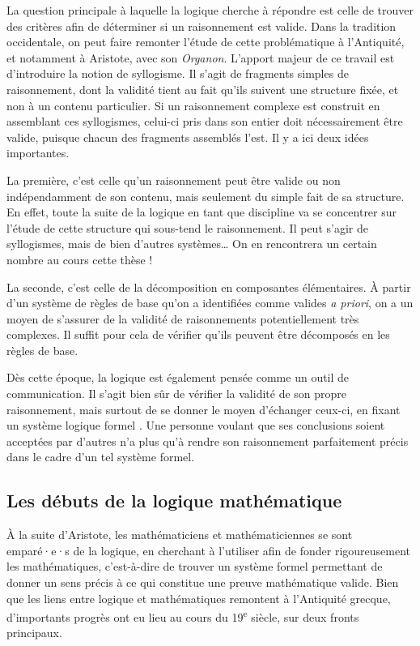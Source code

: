 La question principale à laquelle la logique cherche à répondre
est celle de trouver des critères afin de déterminer si un raisonnement est valide.
Dans la tradition occidentale, on peut faire remonter l’étude de cette problématique
à l’Antiquité, et notamment à Aristote, avec son \textit{Organon}.
L’apport majeur de ce travail est d’introduire la notion de syllogisme.
Il s’agit de fragments simples de raisonnement, dont la validité tient au fait qu’ils
suivent une structure fixée, et non à un contenu particulier.%
Si un raisonnement complexe est construit en assemblant ces syllogismes,
celui-ci pris dans son entier doit nécessairement être valide, puisque
chacun des fragments assemblés l’est. Il y a ici deux idées importantes.

La première, c’est celle qu’un raisonnement peut être
valide ou non indépendamment de son contenu, mais seulement du simple fait de sa structure.
En effet, toute la suite de la logique en tant que discipline va se concentrer sur l’étude
de cette structure qui sous-tend le raisonnement.
Il peut s’agir de syllogismes, mais de bien d’autres systèmes… On en rencontrera
un certain nombre au cours cette thèse !

La seconde, c’est celle de la décomposition en composantes élémentaires. À
partir d’un système de règles de base qu’on a identifiées comme valides 
\textit{a priori}, on a un moyen de s’assurer de la validité
de raisonnements potentiellement très complexes.
Il suffit pour cela de vérifier qu’ils peuvent être décomposés en
les règles de base.

Dès cette époque, la logique est également pensée comme un outil de communication.
Il s’agit bien sûr de vérifier la validité de son propre raisonnement,
mais surtout de se donner le moyen d’échanger ceux-ci,
en fixant un système logique formel%
.
Une personne voulant que ses conclusions soient acceptées par d’autres n’a plus qu’à
rendre son raisonnement parfaitement précis dans le cadre d’un tel système formel.

\subsection{Les débuts de la logique mathématique}

À la suite d’Aristote, les mathématiciens et mathématiciennes se sont emparé·e·s
de la logique, en cherchant à l’utiliser afin de fonder rigoureusement les mathématiques,
c’est-à-dire de trouver un système formel permettant de donner un sens précis à ce
qui constitue une preuve mathématique valide.
Bien que les liens entre logique et mathématiques remontent à l’Antiquité grecque,
d’importants progrès ont eu lieu au cours
du 19\textsuperscript{e} siècle, sur deux fronts principaux.

